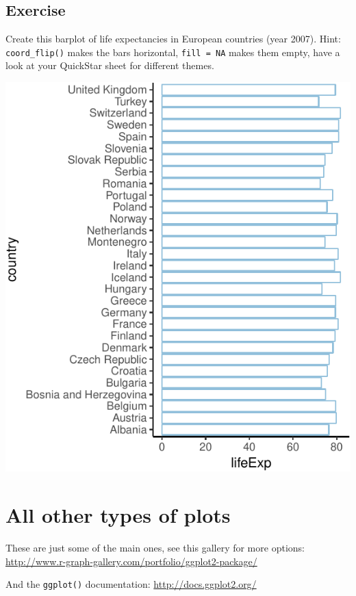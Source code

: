 \documentclass[12pt,]{krantz}
\theoremstyle{definition}
\theoremstyle{definition}
\theoremstyle{definition}
\theoremstyle{remark}
\begin{document}
\hypertarget{exercise-21}{%
\subsection{Exercise}\label{exercise-21}}

Create this barplot of life expectancies in European countries (year
2007). Hint: \texttt{coord\_flip()} makes the bars horizontal,
\texttt{fill\ =\ NA} makes them empty, have a look at your QuickStar
sheet for different themes.

\includegraphics{04_plotting_files/figure-latex/unnamed-chunk-15-1.pdf}

\hypertarget{all-other-types-of-plots}{%
\section{All other types of plots}\label{all-other-types-of-plots}}

These are just some of the main ones, see this gallery for more options:
\url{http://www.r-graph-gallery.com/portfolio/ggplot2-package/}

And the \texttt{ggplot()} documentation: \url{http://docs.ggplot2.org/}
\end{document}
